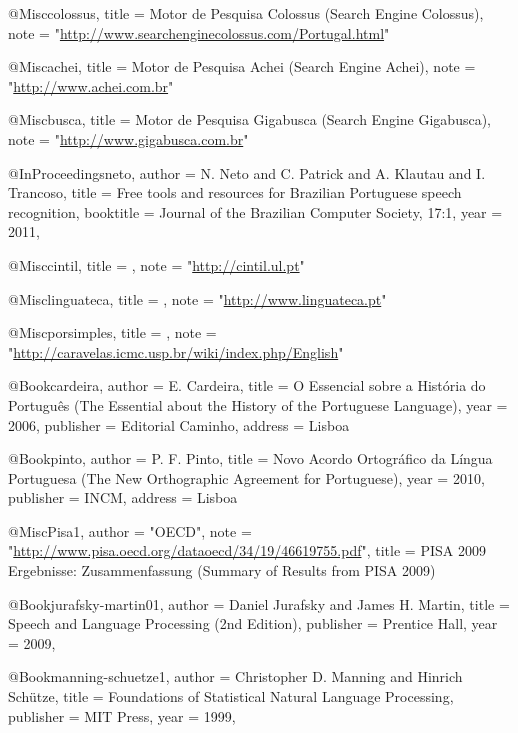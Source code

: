 @Misc{colossus,
  title =	 {{Motor de Pesquisa Colossus (Search Engine Colossus)}},
  note =
                  "\url{http://www.searchenginecolossus.com/Portugal.html}"
}

@Misc{achei,
  title =	 {{Motor de Pesquisa Achei (Search Engine Achei)}},
  note =
                  "\url{http://www.achei.com.br}"
}

@Misc{busca,
  title =	 {{Motor de Pesquisa Gigabusca (Search Engine Gigabusca)}},
  note =
                  "\url{http://www.gigabusca.com.br}"
}


@InProceedings{neto,
  author =	 {N. Neto and C. Patrick and  A. Klautau and I. Trancoso},
  title =	 {{Free tools and resources for Brazilian
\newblock Portuguese speech recognition}},
  booktitle =	 {Journal of the Brazilian Computer Society, 17:1},
  year =	 2011,
}

@Misc{cintil,
  title =	 {{}},
  note =
                  "\url{http://cintil.ul.pt}"
}

@Misc{linguateca,
  title =	 {{}},
  note =
                  "\url{http://www.linguateca.pt}"
}

@Misc{porsimples,
  title =	 {{}},
  note =
                  "\url{http://caravelas.icmc.usp.br/wiki/index.php/English}"
}


@Book{cardeira,
  author =	 {E. Cardeira},
  title =	 {{O Essencial sobre a História do Português (The Essential about the History of the Portuguese Language)}},
  year =	 2006,
  publisher = {Editorial Caminho},
  address =	 {Lisboa}
}


@Book{pinto,
  author =	 {P. F. Pinto},
  title =	 {{ Novo Acordo Ortográfico da Língua Portuguesa (The New Orthographic Agreement for Portuguese)}},
  year =	 2010,
  publisher = {INCM},
  address =	 {Lisboa}
}

@Misc{Pisa1,
  author =	 "OECD",
  note =
                  "\url{http://www.pisa.oecd.org/dataoecd/34/19/46619755.pdf}",
  title =	 {{PISA 2009 Ergebnisse: Zusammenfassung (Summary of
                  Results from PISA 2009)}}
}


@Book{jurafsky-martin01,
  author = 	 {Daniel Jurafsky and James H. Martin},
  title = 	 {{Speech and Language Processing (2nd Edition)}},
  publisher = 	 {Prentice Hall},
  year = 	 {2009},
}


@Book{manning-schuetze1,
  author = 	 {Christopher D. Manning and Hinrich Schütze},
  title = 	 {{Foundations of Statistical Natural Language Processing}},
  publisher = 	 {MIT Press},
  year = 	 {1999},
}


